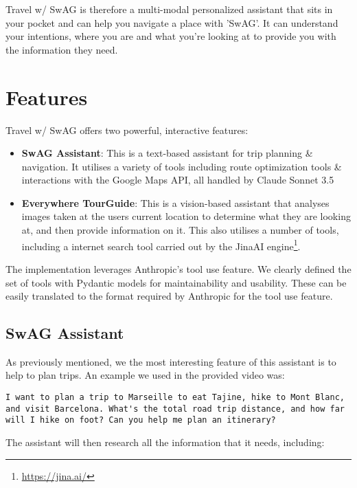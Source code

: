 \documentclass{article}
\begin{document}
Travel w/ SwAG is therefore a multi-modal personalized assistant that sits in your pocket and can help you navigate a place with 'SwAG'. It can understand your intentions, where you are and what you're looking at to provide you with the information they need.

\section{Features}

Travel w/ SwAG  offers two powerful, interactive features:

\begin{itemize}
\item \textbf{SwAG Assistant}: This is a text-based assistant for trip planning \& navigation. It utilises a variety of tools including route optimization tools \& interactions with the Google Maps API, all handled by Claude Sonnet 3.5
\item \textbf{Everywhere TourGuide}: This is a vision-based assistant that analyses images taken at the users current location to determine what they are looking at, and then provide information on it. This also utilises a number of tools, including a internet search tool carried out by the JinaAI engine\footnote{\url{https://jina.ai/}}.
\end{itemize}

The implementation leverages Anthropic's tool use feature. We clearly defined the set of tools with Pydantic models for maintainability and usability. These can be easily translated to the format required by Anthropic for the tool use feature.

\subsection{SwAG Assistant}

As previously mentioned, we the most interesting feature of this assistant is to help to plan trips. An example we used in the provided video was:

\begin{lstlisting}
I want to plan a trip to Marseille to eat Tajine, hike to Mont Blanc, and visit Barcelona. What's the total road trip distance, and how far will I hike on foot? Can you help me plan an itinerary?
\end{lstlisting}

The assistant will then research all the information that it needs, including:
\end{document}
